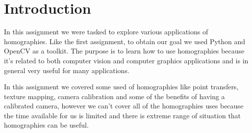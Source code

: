\section{Introduction}

In this assignment we were tasked to explore various applications of homographies. Like the first assignment, to obtain our goal we used Python and OpenCV as a toolkit. The purpose is to learn how to use homographies because it’s related to both computer vision and computer graphics applications and is in general very useful for many applications. 

In this assignment we covered some used of homographies like point transfers, texture mapping, camera calibration and some of the beneﬁts of having a calibrated camera, however we can’t cover all of the homographies uses because the time available for us is limited and there is extreme range of situation that homographies can be useful.
